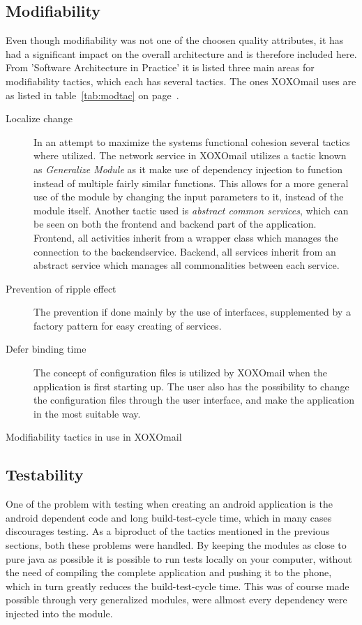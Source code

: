 	\subsection{Modifiability}
		Even though modifiability was not one of the choosen quality attributes, it has had a significant impact on the overall architecture and is therefore included here. From 'Software Architecture in Practice'\cite[p. 111]{bib:archi} it is listed three main areas for modifiability tactics, which each has several tactics. The ones XOXOmail uses are as listed in table~\ref{tab:modtac} on page~\pageref{tab:modtac}.
		\begin{table}[H]
			\begin{description}
				\item[Localize change] In an attempt to maximize the systems functional cohesion several tactics where utilized. The network service in XOXOmail utilizes a tactic known as \textit{Generalize Module} as it make use of dependency injection to function instead of multiple fairly similar functions. This allows for a more general use of the module by changing the input parameters to it, instead of the module itself. Another tactic used is \textit{abstract common services}, which can be seen on both the frontend and backend part of the application. Frontend, all activities inherit from a wrapper class which manages the connection to the backendservice. Backend, all services inherit from an abstract service which manages all commonalities between each service. 
				\item[Prevention of ripple effect] The prevention if done mainly by the use of interfaces, supplemented by a factory pattern for easy creating of services. 
				\item[Defer binding time] The concept of configuration files is utilized by XOXOmail when the application is first starting up. The user also has the possibility to change the configuration files through the user interface, and make the application in the most suitable way. 
			\end{description}
			\caption{Modifiability tactics in use in XOXOmail}
			\label{tab:modtac}
		\end{table}
		
	\subsection{Testability}
		One of the problem with testing when creating an android application is the android dependent code and long build-test-cycle time, which in many cases discourages testing. As a biproduct of the tactics mentioned in the previous sections, both these problems were handled. By keeping the modules as close to pure java as possible it is possible to run tests locally on your computer, without the need of compiling the complete application and pushing it to the phone, which in turn greatly reduces the build-test-cycle time. This was of course made possible through very generalized modules, were allmost every dependency were injected into the module. 
		
